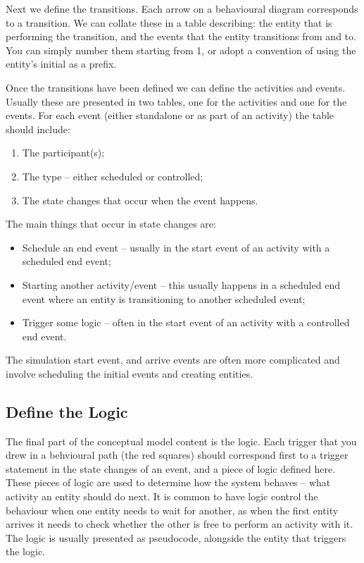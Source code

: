 \documentclass[
  10pt,
  a4paperpaper,
  DIV=11,
  numbers=noendperiod,
  oneside]{scrreprt}
\providecommand{\tightlist}{%
  \setlength{\itemsep}{0pt}\setlength{\parskip}{0pt}}\usepackage{longtable,booktabs,array}
\begin{document}
Next we define the transitions. Each arrow on a behavioural diagram
corresponds to a transition. We can collate these in a table describing:
the entity that is performing the transition, and the events that the
entity transitions from and to. You can simply number them starting from
1, or adopt a convention of using the entity's initial as a prefix.

Once the transitions have been defined we can define the activities and
events. Usually these are presented in two tables, one for the
activities and one for the events. For each event (either standalone or
as part of an activity) the table should include:

\begin{enumerate}
\def\labelenumi{\arabic{enumi}.}
\tightlist
\item
  The participant(s);
\item
  The type -- either scheduled or controlled;
\item
  The state changes that occur when the event happens.
\end{enumerate}

The main things that occur in state changes are:

\begin{itemize}
\tightlist
\item
  Schedule an end event -- usually in the start event of an activity
  with a scheduled end event;
\item
  Starting another activity/event -- this usually happens in a scheduled
  end event where an entity is transitioning to another scheduled event;
\item
  Trigger some logic -- often in the start event of an activity with a
  controlled end event.
\end{itemize}

The simulation start event, and arrive events are often more complicated
and involve scheduling the initial events and creating entities.

\subsection{Define the Logic}\label{define-the-logic}

The final part of the conceptual model content is the logic. Each
trigger that you drew in a behvioural path (the red squares) should
correspond first to a trigger statement in the state changes of an
event, and a piece of logic defined here. These pieces of logic are used
to determine how the system behaves -- what activity an entity should do
next. It is common to have logic control the behaviour when one entity
needs to wait for another, as when the first entity arrives it needs to
check whether the other is free to perform an activity with it. The
logic is usually presented as pseudocode, alongside the entity that
triggers the logic.
\end{document}
